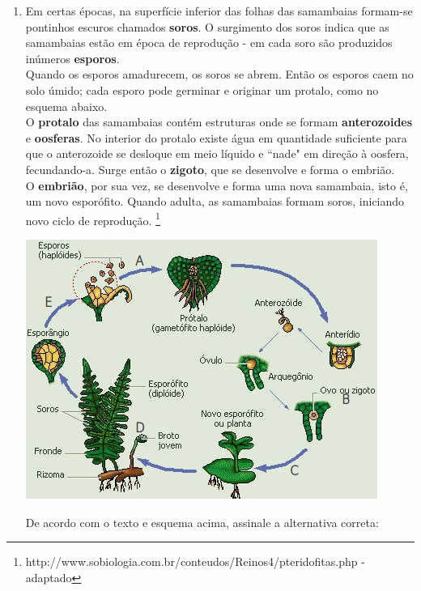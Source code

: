\documentclass[10pt,a4paper]{article}
\newenvironment{Figure}
  {\par\medskip\noindent\minipage{\linewidth}}
  {\endminipage\par\medskip}
\begin{document}
\begin{multicols}{2}
\begin{enumerate}

	\item Em certas \'epocas, na superf\'icie inferior das folhas das samambaias formam-se pontinhos escuros chamados \textbf{soros}. O surgimento dos soros indica que as samambaias est\~ao em \'epoca de reprodu\c{c}\~ao - em cada soro s\~ao produzidos in\'umeros \textbf{esporos}. \\
	Quando os esporos amadurecem, os soros se abrem. Ent\~ao os esporos caem no solo \'umido; cada esporo pode germinar e originar um protalo, como no esquema abaixo. \\
	O \textbf{ protalo} das samambaias cont\'em estruturas onde se formam \textbf{ anterozoides} e \textbf{ oosferas}. No interior do protalo existe \'agua em quantidade suficiente para que o anterozoide se desloque em meio l\'iquido e ``nade" em dire\c{c}\~ao \`a oosfera, fecundando-a. Surge ent\~ao o \textbf{ zigoto}, que se desenvolve e forma o embri\~ao. \\
	O \textbf{ embri\~ao}, por sua vez, se desenvolve e forma uma nova samambaia, isto \'e, um novo espor\'ofito. Quando adulta, as samambaias formam soros, iniciando novo ciclo de reprodu\c{c}\~ao. \footnote{http://www.sobiologia.com.br/conteudos/Reinos4/pteridofitas.php - adaptado}

\begin{Figure}
     \includegraphics[width=\linewidth]{bio_ciclo.jpg}
\end{Figure}

	De acordo com o texto e esquema acima, assinale a alternativa correta:


\end{enumerate}
\end{multicols}
\end{document}
